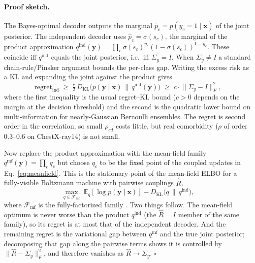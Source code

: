\documentclass[11pt,a4paper]{article}
\theoremstyle{definition}
\newcommand{\Rhat}{\widehat{R}}
\newcommand{\Sigmay}{\Sigma_{y}}
\begin{document}
\paragraph{Proof sketch.} The Bayes-optimal decoder outputs the marginal $\bar p_c=p(y_c{=}1\mid\mathbf{x})$ of the joint posterior. The independent decoder uses $\hat p_c=\sigma(s_c)$, the marginal of the product approximation $q^{\mathrm{ind}}(\mathbf{y})=\prod_c\sigma(s_c)^{y_c}(1-\sigma(s_c))^{1-y_c}$. These coincide iff $q^{\mathrm{ind}}$ equals the joint posterior, i.e.\ iff $\Sigmay=I$. When $\Sigmay\neq I$ a standard chain-rule/Pinsker argument bounds the per-class gap. Writing the excess risk as a KL and expanding the joint against the product gives
\begin{equation*}
\mathrm{regret}_{\mathrm{ind}}\;\geq\;\tfrac{c}{2}\,D_{\mathrm{KL}}\!\big(p(\mathbf{y}\mid\mathbf{x})\,\big\|\,q^{\mathrm{ind}}(\mathbf{y})\big)\;\geq\;c\cdot\big\|\Sigmay-I\big\|_F^{2},
\end{equation*}
where the first inequality is the usual regret--KL bound ($c>0$ depends on the margin at the decision threshold) and the second is the quadratic lower bound on multi-information for nearly-Gaussian Bernoulli ensembles. The regret is second order in the correlation, so small $\rho_{cd}$ costs little, but real comorbidity ($\rho$ of order $0.3$--$0.6$ on ChestX-ray14) is not small.

Now replace the product approximation with the mean-field family $q^{\mathrm{mf}}(\mathbf{y})=\prod_c q_c$ but choose $q_c$ to be the fixed point of the coupled updates in Eq.~\eqref{eq:meanfield}. This is the stationary point of the mean-field ELBO for a fully-visible Boltzmann machine with pairwise couplings $\Rhat$,
\begin{equation*}
\max_{q\in\mathcal{F}_{\mathrm{mf}}}\;\mathbb{E}_{q}\!\left[\log p(\mathbf{y}\mid\mathbf{x})\right]-D_{\mathrm{KL}}\!\big(q\,\big\|\,q^{\mathrm{ind}}\big),
\end{equation*}
where $\mathcal{F}_{\mathrm{mf}}$ is the fully-factorized family \citep{wainwright2008variational}. Two things follow. The mean-field optimum is never worse than the product $q^{\mathrm{ind}}$ (the $\Rhat{=}I$ member of the same family), so its regret is at most that of the independent decoder. And the remaining regret is the variational gap between $q^{\mathrm{mf}}$ and the true joint posterior; decomposing that gap along the pairwise terms shows it is controlled by $\|\Rhat-\Sigmay\|_F^{2}$, and therefore vanishes as $\Rhat\to\Sigmay$. $\square$
\end{document}
